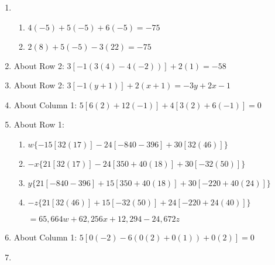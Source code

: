 \documentclass[12pt]{article}
\begin{document}
\begin{enumerate}
  \item

    \begin{enumerate}

      \item $4(-5)+5(-5)+6(-5)=-75$

      \item $2(8)+5(-5)-3(22)=-75$

    \end{enumerate}

    \setcounter{enumi}{18}

  \item About Row 2: $3[-1(3(4)-4(-2))]+2(1)=-58$

    \setcounter{enumi}{24}

  \item About Row 2: $3[-1(y+1)]+2(x+1)=-3y+2x-1$

    \setcounter{enumi}{26}

  \item About Column 1: $5[6(2)+12(-1)]+4[3(2)+6(-1)]=0$

    \setcounter{enumi}{28}

  \item About Row 1:

    \begin{enumerate}

      \item $w\{-15[32(17)]-24[-840-396]+30[32(46)]\}$

      \item $-x\{21[32(17)]-24[350+40(18)]+30[-32(50)]\}$

      \item $y\{21[-840-396]+15[350+40(18)]+30[-220+40(24)]\}$

      \item $-z\{21[32(46)]+15[-32(50)]+24[-220+24(40)]\}$

        \begin{center}
           $=65,664w+62,256x+12,294-24,672z$
        \end{center}

    \end{enumerate}

    \setcounter{enumi}{40}

  \item About Column 1: $5[0(-2)-6(0(2)+0(1))+0(2)]=0$

    \setcounter{enumi}{42}

  \item


\end{enumerate}
\end{document}

